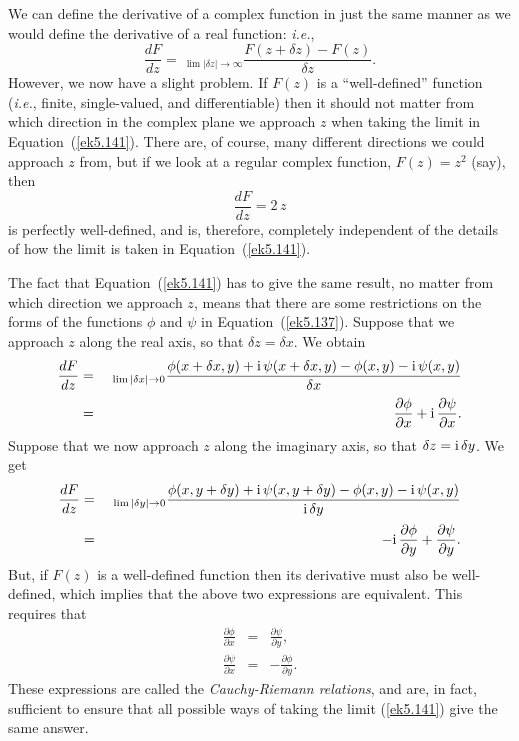 We can define the derivative of a complex function in just the same manner as
we would  define the derivative of a real function: {\em i.e.}, 
\begin{equation}\label{ek5.141}
\frac{dF}{dz} = ~_{\lim |\delta z|\rightarrow\infty}
\frac{F(z+\delta z) - F(z) }{\delta z}.
\end{equation}
However, we now have a slight problem. If $F(z)$ is a ``well-defined''
function ({\em i.e.}, finite, single-valued, and differentiable) then it should not matter from which direction in the complex
plane we approach $z$ when taking the limit in Equation~(\ref{ek5.141}).
 There are, of course, many
different directions we could approach $z$ from, but if we look at a regular complex
function, $F(z) = z^2$  (say), then
\begin{equation}
\frac{dF}{dz} = 2 \,z
\end{equation}
is perfectly well-defined, and is, therefore,  completely independent of the details of
how the limit is taken in Equation~(\ref{ek5.141}).

The fact that Equation~(\ref{ek5.141})
 has to give the same result, no matter from which direction we approach
$z$, means that there are some restrictions on the forms of the functions $\phi$ and $\psi$ in
 Equation~(\ref{ek5.137}).
Suppose that we approach $z$ along the real axis, so that $\delta z = \delta x$.
We obtain
\begin{eqnarray}\label{ep7.28x}
\frac{dF}{dz}& =& ~_{\lim |\delta x|\rightarrow 0}
\frac{\phi(x+\delta x, y) + {\rm i}\, \psi(x+\delta x, y) - \phi(x, y) - {\rm i}\,
\psi(x,y)}{\delta x} 
\nonumber\\[0.5ex]
&=& \frac{\partial \phi}{\partial x} + {\rm i}\, \frac{\partial \psi}
{\partial x}.
\end{eqnarray}
Suppose that we now approach $z$ along the imaginary axis, so that $\delta z
= {\rm i}\,\delta y$. We get
\begin{eqnarray}
\frac{dF}{dz} &=& ~_{\lim |\delta y|\rightarrow 0}
\frac{\phi(x, y+\delta y) + {\rm i}\, \psi(x, y+\delta y) - \phi(x, y) - {\rm i}\,
\psi(x,y)}{{\rm i}\,\delta y}  \nonumber\\[0.5ex]
&=&
-{\rm i}\,\frac{\partial \phi}{\partial y} + \frac{\partial \psi}
{\partial y}.
\end{eqnarray}
But, if $F(z)$ is a well-defined function then its derivative must also be 
well-defined,
which implies that the above two expressions are equivalent. This 
requires that
\begin{eqnarray}\label{ep7.27}
\frac{\partial \phi}{\partial x} &=& \frac{\partial \psi}{\partial y},\\[0.5ex]
\frac{\partial \psi}{\partial x} &=& -\frac{\partial \phi}{\partial y}.\label{ep7.28}
\end{eqnarray}
These expressions are called the {\em Cauchy-Riemann relations}, and are, in fact, sufficient to ensure 
that  all possible ways of taking the limit (\ref{ek5.141})  give the same answer.

